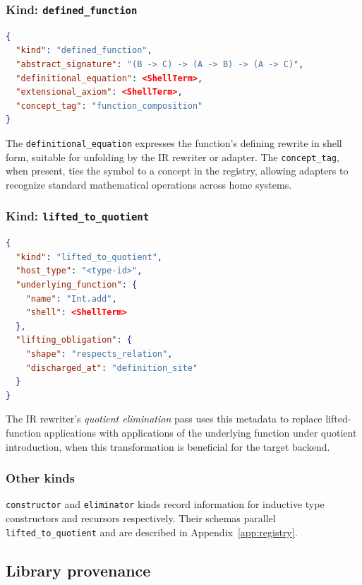 \documentclass[11pt,letterpaper]{article}
\theoremstyle{definition}
\theoremstyle{remark}
\begin{document}
\subsubsection{Kind: \texttt{defined\_function}}

\begin{lstlisting}[language=json]
{
  "kind": "defined_function",
  "abstract_signature": "(B -> C) -> (A -> B) -> (A -> C)",
  "definitional_equation": <ShellTerm>,
  "extensional_axiom": <ShellTerm>,
  "concept_tag": "function_composition"
}
\end{lstlisting}

The \texttt{definitional\_equation} expresses the function's defining
rewrite in shell form, suitable for unfolding by the IR rewriter or
adapter. The \texttt{concept\_tag}, when present, ties the symbol to a
concept in the registry, allowing adapters to recognize standard
mathematical operations across home systems.

\subsubsection{Kind: \texttt{lifted\_to\_quotient}}

\begin{lstlisting}[language=json]
{
  "kind": "lifted_to_quotient",
  "host_type": "<type-id>",
  "underlying_function": {
    "name": "Int.add",
    "shell": <ShellTerm>
  },
  "lifting_obligation": {
    "shape": "respects_relation",
    "discharged_at": "definition_site"
  }
}
\end{lstlisting}

The IR rewriter's \emph{quotient elimination} pass uses this metadata to
replace lifted-function applications with applications of the underlying
function under quotient introduction, when this transformation is
beneficial for the target backend.

\subsubsection{Other kinds}

\texttt{constructor} and \texttt{eliminator} kinds record information for
inductive type constructors and recursors respectively. Their schemas
parallel \texttt{lifted\_to\_quotient} and are described in
Appendix~\ref{app:registry}.

\subsection{Library provenance}
\end{document}

